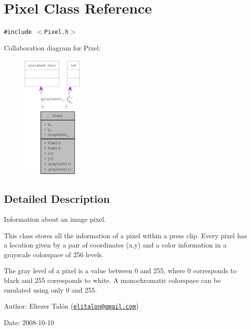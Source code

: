 \hypertarget{class_pixel}{
\section{Pixel Class Reference}
\label{class_pixel}
}
{\tt \#include $<$Pixel.h$>$}

Collaboration diagram for Pixel:\nopagebreak
\begin{figure}[H]
\begin{center}
\leavevmode
\includegraphics[width=89pt]{class_pixel__coll__graph}
\end{center}
\end{figure}


\subsection{Detailed Description}
Information about an image pixel. 

This class stores all the information of a pixel within a press clip. Every pixel has a location given by a pair of coordinates (x,y) and a color information in a grayscale colorspace of 256 levels.

The gray level of a pixel is a value between 0 and 255, where 0 corresponds to black and 255 corresponds to white. A monochromatic colorspace can be emulated using only 0 and 255.

\begin{Desc}
\item[Author:]Eliezer Talón (\href{mailto:elitalon@gmail.com}{\tt elitalon@gmail.com}) \end{Desc}
\begin{Desc}
\item[Date:]2008-10-10 \end{Desc}


